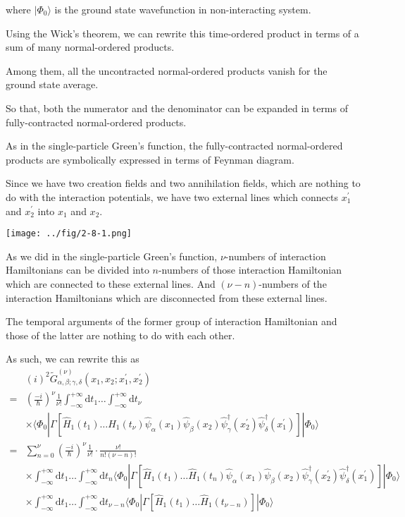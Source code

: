 where $| \Phi_0 \rangle$ is the ground state wavefunction in non-interacting system.

Using the Wick's theorem, we can rewrite this time-ordered product in terms of a sum of many normal-ordered products.

Among them, all the uncontracted normal-ordered products vanish for the ground state average.

So that, both the numerator and the denominator can be expanded in terms of fully-contracted normal-ordered products.

As in the single-particle Green's function, the fully-contracted normal-ordered products are symbolically expressed in terms of Feynman diagram.

Since we have two creation fields and two annihilation fields, which are nothing to do with the interaction potentials, we have two external lines which connects $x_1^{'}$ and $x_2^{'}$ into $x_1$ and $x_2$.
\begin{center} \label{Fig2.8.1}
\texttt{[image: ../fig/2-8-1.png]}
\end{center}

As we did in the single-particle Green's function, $\nu$-numbers of interaction Hamiltonians can be divided into $n$-numbers of those interaction Hamiltonian which are connected to these external lines. And $(\nu-n)$-numbers of the interaction Hamiltonians which are disconnected from these external lines.

The temporal arguments of the former group of interaction Hamiltonian and those of the latter are nothing to do with each other.

As such, we can rewrite this as
\[ \begin{split} &(i)^2\tilde{G}^{(\nu)}_{\alpha,\beta;\gamma,\delta}(x_1,x_2;x_1^{'},x_2^{'})\\
 =& \left( \frac{-i}{\hbar} \right)^\nu \frac{1}{\nu!} \int_{-\infty}^{+\infty}\mathrm{d}t_1 \ldots \int_{-\infty}^{+\infty}\mathrm{d}t_\nu \\
&\times \langle \Phi_0 | \Gamma[\hat{H}_1(t_1)\ldots\hat{H}_1(t_\nu)\hat{\psi}_\alpha(x_1) \hat{\psi}_\beta(x_2) \hat{\psi}_\gamma^\dagger(x_2^{'}) \hat{\psi}_\delta^\dagger(x_1^{'})]|\Phi_0\rangle\\
=& \sum_{n=0}^{\nu}\left( \frac{-i}{\hbar} \right)^\nu \frac{1}{\nu!}\cdot\frac{\nu!}{n!(\nu-n)!}\\
&\times\int_{-\infty}^{+\infty}\mathrm{d}t_1 \ldots \int_{-\infty}^{+\infty}\mathrm{d}t_n
\langle \Phi_0 | \Gamma[\hat{H}_1(t_1)\ldots\hat{H}_1(t_n)\hat{\psi}_\alpha(x_1) \hat{\psi}_\beta(x_2) \hat{\psi}_\gamma^\dagger(x_2^{'}) \hat{\psi}_\delta^\dagger(x_1^{'})]|\Phi_0\rangle\\
&\times\int_{-\infty}^{+\infty}\mathrm{d}t_1 \ldots \int_{-\infty}^{+\infty}\mathrm{d}t_{\nu-n}
\langle \Phi_0 | \Gamma[\hat{H}_1(t_1)\ldots\hat{H}_1(t_{\nu-n})]|\Phi_0\rangle
\end{split} \]

